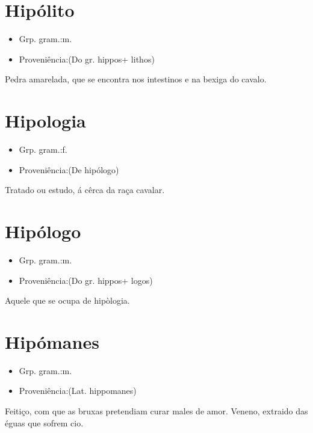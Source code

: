 \documentclass{article}
\begin{document}
\section{Hipólito}
\begin{itemize}
\item {Grp. gram.:m.}
\end{itemize}
\begin{itemize}
\item {Proveniência:(Do gr. \textunderscore hippos\textunderscore  + \textunderscore lithos\textunderscore )}
\end{itemize}
Pedra amarelada, que se encontra nos intestinos e na bexiga do cavalo.
\section{Hipologia}
\begin{itemize}
\item {Grp. gram.:f.}
\end{itemize}
\begin{itemize}
\item {Proveniência:(De \textunderscore hipólogo\textunderscore )}
\end{itemize}
Tratado ou estudo, á cêrca da raça cavalar.
\section{Hipólogo}
\begin{itemize}
\item {Grp. gram.:m.}
\end{itemize}
\begin{itemize}
\item {Proveniência:(Do gr. \textunderscore hippos\textunderscore  + \textunderscore logos\textunderscore )}
\end{itemize}
Aquele que se ocupa de hipòlogia.
\section{Hipómanes}
\begin{itemize}
\item {Grp. gram.:m.}
\end{itemize}
\begin{itemize}
\item {Proveniência:(Lat. \textunderscore hippomanes\textunderscore )}
\end{itemize}
Feitiço, com que as bruxas pretendiam curar males de amor.
Veneno, extraido das éguas que sofrem cio.
\end{document}

